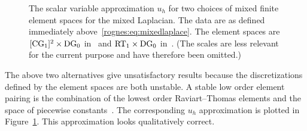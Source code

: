 \begin{figure}
  \centering
  \caption{The scalar variable approximation $u_h$ for two choices
    of mixed finite element spaces for the mixed Laplacian. The data
    are as defined immediately above~\eqref{rognes:eq:mixedlaplace}.
    The element spaces are $[\mathrm{CG}_{1}]^{2} \times \mathrm{DG}_{0}$
    in~ and $\mathrm{RT}_{1} \times \mathrm{DG}_{0}$
    in~. (The scales are less relevant for the
    current purpose and have therefore been
    omitted.)}
  \label{rognes:fig:example}
\end{figure}

The above two alternatives give unsatisfactory results because the
discretizations defined by the element spaces are both unstable. A
stable low order element pairing is the combination of the lowest
order Raviart--Thomas elements and the space of piecewise
constants~\citep{RaviartThomas1977}. The corresponding $u_h$
approximation is plotted in
Figure~\ref{rognes:fig:example}. This
approximation looks qualitatively correct.

